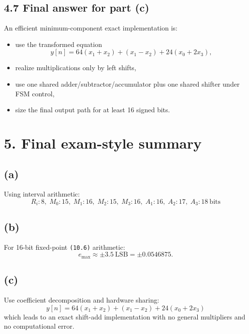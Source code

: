 \documentclass[11pt,a4paper]{article}
\begin{document}
\subsection*{4.7 Final answer for part (c)}
An efficient minimum-component exact implementation is:
\begin{itemize}
  \item use the transformed equation
  \[
  y[n]=64(x_1+x_2)+(x_1-x_2)+24(x_0+2x_3),
  \]
  \item realize multiplications only by left shifts,
  \item use one shared adder/subtractor/accumulator plus one shared shifter under FSM control,
  \item size the final output path for at least 16 signed bits.
\end{itemize}

\section*{5. Final exam-style summary}
\subsection*{(a)}
Using interval arithmetic:
\[
\boxed{
R_i:8,\;
M_0:15,\;
M_1:16,\;
M_2:15,\;
M_3:16,\;
A_1:16,\;
A_2:17,\;
A_3:18\ \text{bits}
}
\]

\subsection*{(b)}
For 16-bit fixed-point \texttt{(10.6)} arithmetic:
\[
\boxed{e_{\max}\approx \pm 3.5\ \text{LSB}=\pm 0.0546875.}
\]

\subsection*{(c)}
Use coefficient decomposition and hardware sharing:
\[
\boxed{y[n]=64(x_1+x_2)+(x_1-x_2)+24(x_0+2x_3)}
\]
which leads to an exact shift-add implementation with no general multipliers and no computational error.
\end{document}
